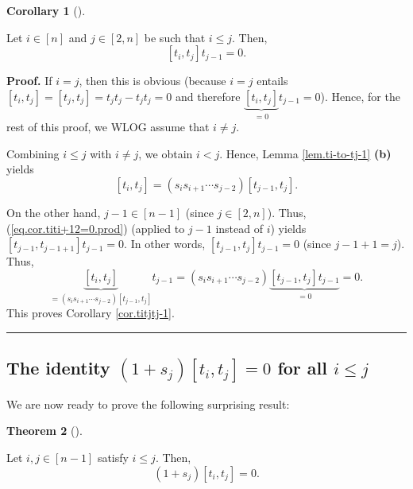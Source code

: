 \documentclass[numbers=enddot,12pt,final,onecolumn,notitlepage]{scrartcl}%
\theoremstyle{definition}
\newtheorem{theo}{Theorem}[section]
\newenvironment{theorem}[1][]
{\begin{theo}[#1]\begin{leftbar}}
{\end{leftbar}\end{theo}}
\newtheorem{coro}[theo]{Corollary}
\newenvironment{corollary}[1][]
{\begin{coro}[#1]\begin{leftbar}}
{\end{leftbar}\end{coro}}
\newenvironment{proof}[1][Proof]{\noindent\textbf{#1.} }{\ \rule{0.5em}{0.5em}}
\begin{document}
\begin{corollary}
\label{cor.titjtj-1}Let $i\in\left[  n\right]  $ and $j\in\left[  2,n\right]
$ be such that $i\leq j$. Then,%
\[
\left[  t_{i},t_{j}\right]  t_{j-1}=0.
\]

\end{corollary}

\begin{proof}
If $i=j$, then this is obvious (because $i=j$ entails $\left[  t_{i}%
,t_{j}\right]  =\left[  t_{j},t_{j}\right]  =t_{j}t_{j}-t_{j}t_{j}=0$ and
therefore $\underbrace{\left[  t_{i},t_{j}\right]  }_{=0}t_{j-1}=0$). Hence,
for the rest of this proof, we WLOG assume that $i\neq j$.

Combining $i\leq j$ with $i\neq j$, we obtain $i<j$. Hence, Lemma
\ref{lem.ti-to-tj-1} \textbf{(b)} yields
\[
\left[  t_{i},t_{j}\right]  =\left(  s_{i}s_{i+1}\cdots s_{j-2}\right)
\left[  t_{j-1},t_{j}\right]  .
\]


On the other hand, $j-1\in\left[  n-1\right]  $ (since $j\in\left[
2,n\right]  $). Thus, (\ref{eq.cor.titi+12=0.prod}) (applied to $j-1$ instead
of $i$) yields $\left[  t_{j-1},t_{j-1+1}\right]  t_{j-1}=0$. In other words,
$\left[  t_{j-1},t_{j}\right]  t_{j-1}=0$ (since $j-1+1=j$). Thus,%
\[
\underbrace{\left[  t_{i},t_{j}\right]  }_{=\left(  s_{i}s_{i+1}\cdots
s_{j-2}\right)  \left[  t_{j-1},t_{j}\right]  }t_{j-1}=\left(  s_{i}%
s_{i+1}\cdots s_{j-2}\right)  \underbrace{\left[  t_{j-1},t_{j}\right]
t_{j-1}}_{=0}=0.
\]
This proves Corollary \ref{cor.titjtj-1}.
\end{proof}

\subsection{The identity $\left(  1+s_{j}\right)  \left[  t_{i},t_{j}\right]
=0$ for all $i\leq j$}

We are now ready to prove the following surprising result:

\begin{theorem}
\label{thm.1+sjtitj}Let $i,j\in\left[  n-1\right]  $ satisfy $i\leq j$. Then,
\[
\left(  1+s_{j}\right)  \left[  t_{i},t_{j}\right]  =0.
\]

\end{theorem}
\end{document}
